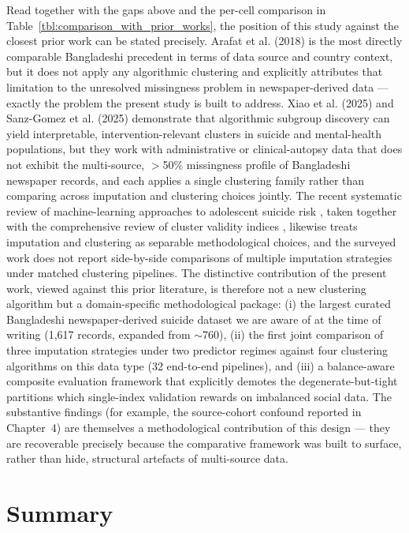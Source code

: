 Read together with the gaps above and the per-cell comparison in Table~\ref{tbl:comparison_with_prior_works}, the position of this study against the closest prior work can be stated precisely. Arafat et al. (2018) \cite{ref4} is the most directly comparable Bangladeshi precedent in terms of data source and country context, but it does not apply any algorithmic clustering and explicitly attributes that limitation to the unresolved missingness problem in newspaper-derived data --- exactly the problem the present study is built to address. Xiao et al. (2025) \cite{ref35} and Sanz-Gomez et al. (2025) \cite{ref36} demonstrate that algorithmic subgroup discovery can yield interpretable, intervention-relevant clusters in suicide and mental-health populations, but they work with administrative or clinical-autopsy data that does not exhibit the multi-source, $>$50\% missingness profile of Bangladeshi newspaper records, and each applies a single clustering family rather than comparing across imputation and clustering choices jointly. The recent systematic review of machine-learning approaches to adolescent suicide risk \cite{ref53}, taken together with the comprehensive review of cluster validity indices \cite{ref54}, likewise treats imputation and clustering as separable methodological choices, and the surveyed work does not report side-by-side comparisons of multiple imputation strategies under matched clustering pipelines. The distinctive contribution of the present work, viewed against this prior literature, is therefore not a new clustering algorithm but a domain-specific methodological package: (i) the largest curated Bangladeshi newspaper-derived suicide dataset we are aware of at the time of writing (1,617 records, expanded from $\sim$760), (ii) the first joint comparison of three imputation strategies under two predictor regimes against four clustering algorithms on this data type (32 end-to-end pipelines), and (iii) a balance-aware composite evaluation framework that explicitly demotes the degenerate-but-tight partitions which single-index validation rewards on imbalanced social data. The substantive findings (for example, the source-cohort confound reported in Chapter~4) are themselves a methodological contribution of this design --- they are recoverable precisely because the comparative framework was built to surface, rather than hide, structural artefacts of multi-source data.

\section{Summary}

